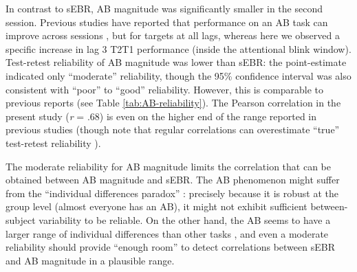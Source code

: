 \documentclass[11pt,]{memoir}
\begin{document}
In contrast to sEBR, AB magnitude was significantly smaller in the second session. Previous studies have reported that performance on an AB task can improve across sessions \autocites{Dale2013}{Slagter2007}, but for targets at all lags, whereas here we observed a specific increase in lag 3 T2\textbar{}T1 performance (inside the attentional blink window). Test-retest reliability of AB magnitude was lower than sEBR: the point-estimate indicated only ``moderate'' reliability, though the 95\% confidence interval was also consistent with ``poor'' to ``good'' reliability. However, this is comparable to previous reports (see Table \ref{tab:AB-reliability}). The Pearson correlation in the present study (\emph{r} = .68) is even on the higher end of the range reported in previous studies (though note that regular correlations can overestimate ``true'' test-retest reliability \autocite{Bland1986}).

The moderate reliability for AB magnitude limits the correlation that can be obtained between AB magnitude and sEBR. The AB phenomenon might suffer from the ``individual differences paradox'' \autocite{Hedge2018}: precisely because it is robust at the group level (almost everyone has an AB), it might not exhibit sufficient between-subject variability to be reliable. On the other hand, the AB seems to have a larger range of individual differences than other tasks \autocite{Willems2016}, and even a moderate reliability should provide ``enough room'' to detect correlations between sEBR and AB magnitude in a plausible range.
\end{document}
